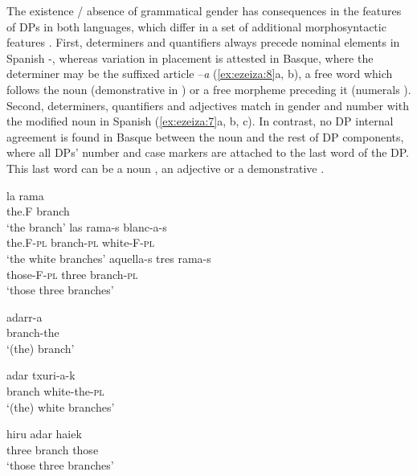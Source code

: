 \documentclass[output=paper]{langscibook}
\begin{document}
{The existence / absence of grammatical gender has consequences in the features of DPs in both languages, which differ in a set of additional morphosyntactic features} {\citep{Corbett2006}}{. First, determiners and quantifiers always precede nominal elements in Spanish -, whereas variation in placement is attested in Basque, where the determiner may be the suffixed article –}{\textit{a}} (\ref{ex:ezeiza:8}a, b), a free word which {follows the noun (demonstrative in ) or a free morpheme preceding it (numerals ). Second, determiners, quantifiers and adjectives match in gender and number with the modified noun in Spanish (\ref{ex:ezeiza:7}a, b, c). In contrast, no DP internal agreement is found in Basque between the noun and the rest of DP components, where all DPs’ number and case markers are attached to the last word of the DP. This last word can be a noun , an adjective  or a demonstrative .}

\ea\label{ex:ezeiza:7}
    \ea\label{ex:ezeiza:7a}
        la   rama\\
        the.F branch\\
        \glt ‘the branch’
\ex\label{ex:ezeiza:7b}
        las  rama-s blanc-a-s\\
        the.F-\textsc{pl} branch-\textsc{pl}  white-F-\textsc{pl}\\
        \glt‘the white branches’
\ex\label{ex:ezeiza:7c}
     aquella-s   tres  rama-s\\
     those-F-\textsc{pl}  three  branch-\textsc{pl}\\
    \glt ‘those three branches’
    \z
\z

\ea%
    \label{ex:ezeiza:8}
\ea \label{ex:ezeiza:8a}
    adarr-a          \\
    branch-the           \\
    \glt  ‘(the) branch’

\ex \label{ex:ezeiza:8b}
    adar   txuri-a-k \\
    branch white-the-\textsc{pl} \\
\glt  ‘(the) white branches’

\ex \label{ex:ezeiza:8c}
    hiru   adar     haiek\\
    three branch those\\
 \glt   ‘those three branches’
     \z
\z
\end{document}
